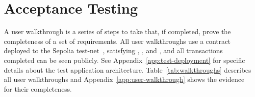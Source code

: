 
\section{Acceptance Testing}\label{sec:acc-tests}

A user walkthrough is a series of steps to take that, if completed, prove the completeness of a set of requirements. 
All user walkthroughs use a contract deployed to the Sepolia test-net~\cite{etherscanio_library_nodate}, satisfying , , and , and all transactions completed can be seen publicly. See Appendix~\ref{app:test-deployment} for specific details about the test application architecture.
\x
Table~\ref{tab:walkthroughs} describes all user walkthroughs and Appendix~\ref{app:user-walkthrough} shows the evidence for their completeness.

\newcommand{\p}[1]{$P_{#1}$}
\newcommand{\g}[1]{$G_{#1}$}

